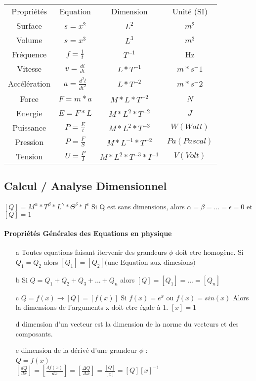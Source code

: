 \begin{tabular}{|c|c|c|c|}
	Propriétés & Equation & Dimension & Unité (SI) \\
	Surface & $s=x^2$ &$ L^2$ & $m^2$\\
	Volume & $s=x^3$ &$ L^3$ & $m^3$\\
	Fréquence & $f=\frac{1}{t}$ & $T^{-1}$ & Hz \\
	Vitesse & $v=\frac{dl}{dt}$ & $L*T^{-1}$ & $m*s^-1$ \\
	Accélération& $a=\frac{d^2l}{dt^2}$ & $L*T^{-2}$ & $m*s^-2$ \\
	Force & $F=m*a$ & $M*L*T^{-2}$ & $N$ \\
	Energie & $E=F*L$ & $M*L^2*T^{-2}$ & $J$ \\
	Puissance & $P=\frac{E}{t}$ & $M*L^2*T^{-3}$ & $W (Watt)$ \\
	Pression & $P=\frac{F}{S}$ & $M*L^{-1}*T^{-2}$ & $Pa (Pascal)$ \\
	Tension & $U=\frac{P}{I}$ & $M*L^2*T^{-3}*I^{-1}$ & $V (Volt)$
\end{tabular}

\subsection{Calcul / Analyse Dimensionnel}
$[Q] = M^\alpha * T^\beta * L^\gamma * \Theta^\delta * I^\epsilon$
Si Q est sans dimensions, alors $\alpha = \beta =...=\epsilon=0$ et 
$[Q]=1$

\paragraph{Propriétés Générales des Equations en physique}
\begin{itemize}
	\item[a] Toutes equations faisant itervenir des grandeurs $\phi$ doit etre homogène.
		Si $Q_1 = Q_2$ alors $[Q_1] = [Q_2] \text{(une Equation aux dimesions)}$
	\item[b] Si $Q=Q_1 + Q_2 + Q_3 + ... + Q_n$ alors $[Q]=[Q_1]=...=[Q_n]$
	\item[c] $Q = f(x) \rightarrow [Q] = [f(x)]$
		Si $f(x) = e^x$ ou  $f(x) = sin(x)$ Alors la dimensions de l'arguments x doit etre égale à 1. $[x] = 1$
	\item[d] dimension d'un vecteur est la dimension de la norme du vecteurs et des composants.
	\item[e] dimension de la dérivé d'une grandeur $\phi$ : ~\\
		$Q=f(x)$ ~\\
		$[\frac{dQ}{dx}] = [\frac{df(x)}{dx}]=[\frac{\Delta Q}{\Delta x}] = \frac{[Q]}{[x]} = [Q][x]^{-1}$
\end{itemize}

